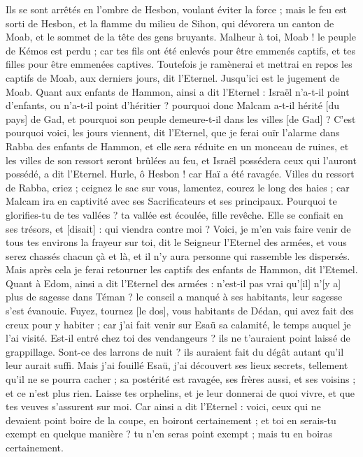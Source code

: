\begin{multicols}{2}
Ils se sont arrêtés en l'ombre de Hesbon, voulant éviter la force ; mais le feu est sorti de Hesbon, et la flamme du milieu de Sihon, qui dévorera un canton de Moab, et le sommet de la tête des gens bruyants.
Malheur à toi, Moab ! le peuple de Kémos est perdu ; car tes fils ont été enlevés pour être emmenés captifs, et tes filles pour être emmenées captives.
Toutefois je ramènerai et mettrai en repos les captifs de Moab, aux derniers jours, dit l'Eternel. Jusqu'ici est le jugement de Moab.
\VerseOne{}Quant aux enfants de Hammon, ainsi a dit l'Eternel : Israël n'a-t-il point d'enfants, ou n'a-t-il point d'héritier ? pourquoi donc Malcam a-t-il hérité [du pays] de Gad, et pourquoi son peuple demeure-t-il dans les villes [de Gad] ?
C'est pourquoi voici, les jours viennent, dit l'Eternel, que je ferai ouïr l'alarme dans Rabba des enfants de Hammon, et elle sera réduite en un monceau de ruines, et les villes de son ressort seront brûlées au feu, et Israël possédera ceux qui l'auront possédé, a dit l'Eternel.
Hurle, ô Hesbon ! car Haï a été ravagée. Villes du ressort de Rabba, criez ; ceignez le sac sur vous, lamentez, courez le long des haies ; car Malcam ira en captivité avec ses Sacrificateurs et ses principaux.
Pourquoi te glorifies-tu de tes vallées ? ta vallée est écoulée, fille revêche. Elle se confiait en ses trésors, et [disait] : qui viendra contre moi ?
Voici, je m'en vais faire venir de tous tes environs la frayeur sur toi, dit le Seigneur l'Eternel des armées, et vous serez chassés chacun çà et là, et il n'y aura personne qui rassemble les dispersés.
Mais après cela je ferai retourner les captifs des enfants de Hammon, dit l'Etemel.
Quant à Edom, ainsi a dit l'Eternel des armées : n'est-il pas vrai qu'[il] n'[y a] plus de sagesse dans Téman ? le conseil a manqué à ses habitants, leur sagesse s'est évanouie.
Fuyez, tournez [le dos], vous habitants de Dédan, qui avez fait des creux pour y habiter ; car j'ai fait venir sur Esaü sa calamité, le temps auquel je l'ai visité.
Est-il entré chez toi des vendangeurs ? ils ne t'auraient point laissé de grappillage. Sont-ce des larrons de nuit ? ils auraient fait du dégât autant qu'il leur aurait suffi.
Mais j'ai fouillé Esaü, j'ai découvert ses lieux secrets, tellement qu'il ne se pourra cacher ; sa postérité est ravagée, ses frères aussi, et ses voisins ; et ce n'est plus rien.
Laisse tes orphelins, et je leur donnerai de quoi vivre, et que tes veuves s'assurent sur moi.
Car ainsi a dit l'Eternel : voici, ceux qui ne devaient point boire de la coupe, en boiront certainement ; et toi en serais-tu exempt en quelque manière ? tu n'en seras point exempt ; mais tu en boiras certainement.

\end{multicols}

